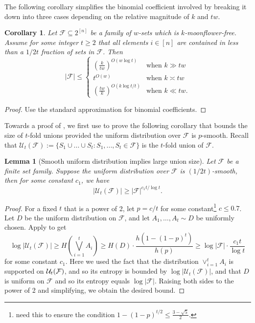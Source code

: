 \documentclass{article}
\newtheorem{lemma}[lemma]{Lemma}
\newtheorem{corollary}[corollary]{Corollary}
\newcommand{\<}{\langle}
\renewcommand{\>}{\rangle}
\newcommand{\calF}{\mathcal{F}}
\newcommand{\calU}{\mathcal{U}}
\begin{document}
The following corollary simplifies the binomial coefficient involved by breaking it down into three cases depending on the relative magnitude of $k$ and $tw$.
\begin{corollary}
     Let $\calF \subseteq 2^{[n]}$ be a family of $w$-sets which is $k$-moonflower-free. 
     Assume for some integer $t \ge 2$ that all elements $i \in [n]$ are contained in less than a $1/2t$ fraction of sets in $\calF$. Then 
     \[
     |\calF| \leq
     \begin{cases}
         \left( \frac{k}{tw}\right)^{O(w \log t)} &\text{when }k \gg tw \\
         t^{O(w)} &\text{when } k \asymp tw \\
         \left( \frac{tw}{k}\right)^{O(k\log t / t)} &\text{when } k \ll tw.
     \end{cases}
     \]
\end{corollary}
\begin{proof}
    Use the standard approximation for binomial coefficients.
\end{proof}
Towards a proof of , we first use  to prove the following corollary that bounds the size of $t$-fold unions provided the uniform distribution over $\calF$ is $p$-smooth. Recall that $\calU_t(\calF):= \{S_1 \cup ... \cup S_t: S_1,...,S_t \in \calF\}$ is the $t$-fold union of $\calF$.

\begin{lemma}[Smooth uniform distribution implies large union size]\label{lem:bound_t_union_size}
    Let $\calF$ be a finite set family. Suppose the uniform distribution over $\calF$ is $(1/2t)$-smooth, then for some constant $c_1$, we have
    \[
    |\calU_t (\calF)| \geq |\calF|^{c_1t / \log t}.
    \]
\end{lemma}
\begin{proof}
    For a fixed $t$ that is a power of 2, let $p = c / t$ for some constant\footnote{need this to ensure the condition $1 - (1-p)^{t/2} \leq \frac{3-\sqrt{5}}{2}$.} $c \le 0.7$. Let $D$ be the uniform distribution on $\calF$, and let $A_1,\ldots,A_t \sim D$ be uniformly chosen. Apply  to get
    \[
    \log |\calU_t (\calF)| \geq H \left(\bigvee_{i=1}^t A_i \right) \geq H(D) \cdot \frac{h(1 - (1-p)^t)}{h(p)} \ge  \log |\calF| \cdot \frac{c_1 t}{\log t}
    \]
    for some constant $c_1$. Here we used the fact that the distribution $\vee_{i=1}^t A_i$ is supported on 
    $\calU_t(\cal F)$, and so its entropy is bounded by $\log |\calU_t(\calF)|$, and that $D$ is uniform on $\calF$ and so its entropy equals $\log |\calF|$. Raising both sides to the power of 2 and simplifying, we obtain the desired bound.
\end{proof}
\end{document}

